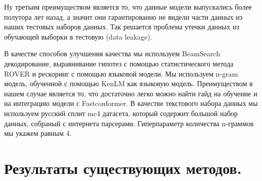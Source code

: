 Ну третьим преимуществом является то, что данные модели выпускались более полутора лет назад, а значит они гарантированно не видели части данных из наших тестовых наборов данных.
Так решается проблема утечки данных из обучающей выборки в тестовую (data leakage).

В качестве способов улучшения качества мы используем BeamSearch декодирование, выравнивание гипотез с помощью статистического метода ROVER и рескоринг с помощью языковой модели.
Мы используем n-gram модель, обученной с помощью KenLM как языковую модель.
Преимуществом в нашем случае является то, что достаточно легко можно найти гайд на обучение и на интеграцию модели с Fastconformer.
В качестве текстового набора данных мы используем русский сплит mc4 датасета, который содержит большой набор данных, собраный с интернета парсерами.
Гиперпараметр количества n-граммов мы укажем равным 4.

\section{Результаты существующих методов.}

